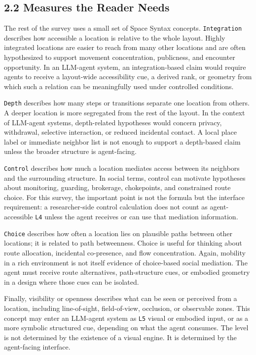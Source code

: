 \documentclass[
  twocolumn]{article}
\begin{document}
\subsection{2.2 Measures the Reader
Needs}\label{measures-the-reader-needs}

The rest of the survey uses a small set of Space Syntax concepts.
\texttt{Integration} describes how accessible a location is relative to
the whole layout. Highly integrated locations are easier to reach from
many other locations and are often hypothesized to support movement
concentration, publicness, and encounter opportunity. In an LLM-agent
system, an integration-based claim would require agents to receive a
layout-wide accessibility cue, a derived rank, or geometry from which
such a relation can be meaningfully used under controlled conditions.

\texttt{Depth} describes how many steps or transitions separate one
location from others. A deeper location is more segregated from the rest
of the layout. In the context of LLM-agent systems, depth-related
hypotheses would concern privacy, withdrawal, selective interaction, or
reduced incidental contact. A local place label or immediate neighbor
list is not enough to support a depth-based claim unless the broader
structure is agent-facing.

\texttt{Control} describes how much a location mediates access between
its neighbors and the surrounding structure. In social terms, control
can motivate hypotheses about monitoring, guarding, brokerage,
chokepoints, and constrained route choice. For this survey, the
important point is not the formula but the interface requirement: a
researcher-side control calculation does not count as agent-accessible
\texttt{L4} unless the agent receives or can use that mediation
information.

\texttt{Choice} describes how often a location lies on plausible paths
between other locations; it is related to path betweenness. Choice is
useful for thinking about route allocation, incidental co-presence, and
flow concentration. Again, mobility in a rich environment is not itself
evidence of choice-based social mediation. The agent must receive route
alternatives, path-structure cues, or embodied geometry in a design
where those cues can be isolated.

Finally, visibility or openness describes what can be seen or perceived
from a location, including line-of-sight, field-of-view, occlusion, or
observable zones. This concept may enter an LLM-agent system as
\texttt{L5} visual or embodied input, or as a more symbolic structured
cue, depending on what the agent consumes. The level is not determined
by the existence of a visual engine. It is determined by the
agent-facing interface.
\end{document}
